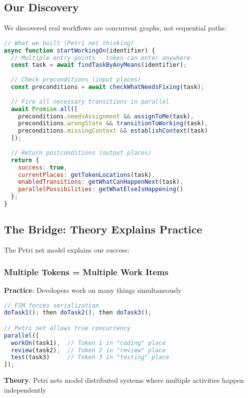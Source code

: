 \documentclass[11pt,a4paper]{article}
\begin{document}
\subsection{Our Discovery}

We discovered real workflows are concurrent graphs, not sequential paths:

\begin{lstlisting}[language=JavaScript]
// What we built (Petri net thinking)
async function startWorkingOn(identifier) {
  // Multiple entry points - token can enter anywhere
  const task = await findTaskByAnyMeans(identifier);
  
  // Check preconditions (input places)
  const preconditions = await checkWhatNeedsFixing(task);
  
  // Fire all necessary transitions in parallel
  await Promise.all([
    preconditions.needsAssignment && assignToMe(task),
    preconditions.wrongState && transitionToWorking(task),
    preconditions.missingContext && establishContext(task)
  ]);
  
  // Return postconditions (output places)
  return {
    success: true,
    currentPlaces: getTokenLocations(task),
    enabledTransitions: getWhatCanHappenNext(task),
    parallelPossibilities: getWhatElseIsHappening()
  };
}
\end{lstlisting}

\subsection{The Bridge: Theory Explains Practice}

The Petri net model explains our success:

\subsubsection{Multiple Tokens = Multiple Work Items}

\textbf{Practice}: Developers work on many things simultaneously

\begin{lstlisting}[language=JavaScript]
// FSM forces serialization
doTask1(); then doTask2(); then doTask3();

// Petri net allows true concurrency
parallel([
  workOn(task1),  // Token 1 in "coding" place
  review(task2),  // Token 2 in "review" place  
  test(task3)     // Token 3 in "testing" place
]);
\end{lstlisting}

\textbf{Theory}: Petri nets model distributed systems where multiple activities happen independently
\end{document}
